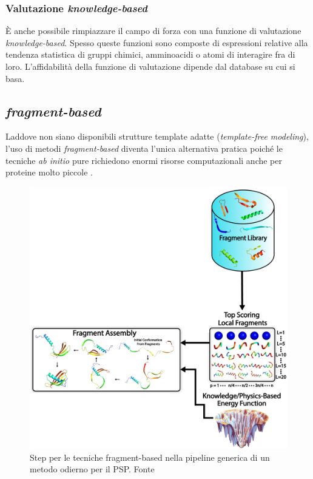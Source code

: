 {{}

\subsubsection{Valutazione \textit{knowledge-based}}
È anche possibile rimpiazzare il campo di forza con una funzione di valutazione \textit{knowledge-based}. Spesso queste funzioni sono composte di espressioni relative alla tendenza statistica di gruppi chimici, amminoacidi o atomi di interagire fra di loro. L'affidabilità della funzione di valutazione dipende dal database su cui si basa. 

\subsection{\textit{fragment-based}}

Laddove non siano disponibili strutture template adatte (\textit{template-free modeling}), l'uso di metodi \textit{fragment-based} diventa l'unica alternativa pratica poiché le tecniche \textit{ab initio} pure richiedono enormi risorse computazionali anche per proteine ​​molto piccole .

\begin{figure}[!htb]
	\centering
	\includegraphics[scale=1]{images/fragment-based.jpg}
	\caption{Step per le tecniche fragment-based nella pipeline generica di un metodo odierno per il PSP. Fonte\cite{pearce2021deep}}
	\label{fig:fragment-based}
\end{figure}

}
